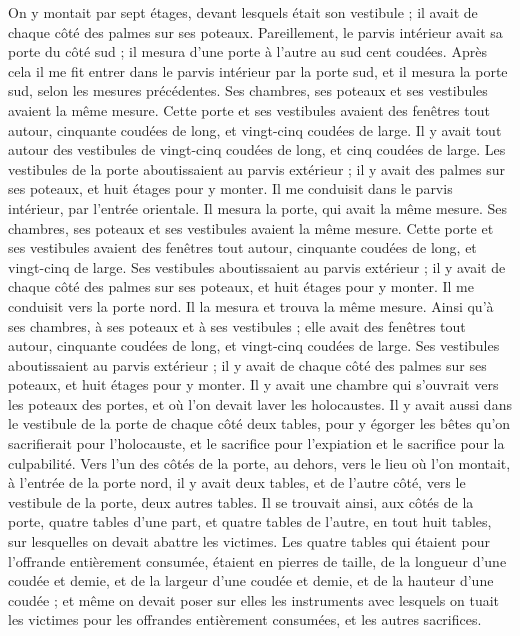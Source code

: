 \begin{multicols}{2}
On y montait par sept étages, devant lesquels était son vestibule ; il avait de chaque côté des palmes sur ses poteaux.
Pareillement, le parvis intérieur avait sa porte du côté sud ; il mesura d'une porte à l'autre au sud cent coudées.
Après cela il me fit entrer dans le parvis intérieur par la porte sud, et il mesura la porte sud, selon les mesures précédentes.
Ses chambres, ses poteaux et ses vestibules avaient la même mesure. Cette porte et ses vestibules avaient des fenêtres tout autour, cinquante coudées de long, et vingt-cinq coudées de large.
Il y avait tout autour des vestibules de vingt-cinq coudées de long, et cinq coudées de large.
Les vestibules de la porte aboutissaient au parvis extérieur ; il y avait des palmes sur ses poteaux, et huit étages pour y monter.
Il me conduisit dans le parvis intérieur, par l'entrée orientale. Il mesura la porte, qui avait la même mesure.
Ses chambres, ses poteaux et ses vestibules avaient la même mesure. Cette porte et ses vestibules avaient des fenêtres tout autour, cinquante coudées de long, et vingt-cinq de large.
Ses vestibules aboutissaient au parvis extérieur ; il y avait de chaque côté des palmes sur ses poteaux, et huit étages pour y monter.
Il me conduisit vers la porte nord. Il la mesura et trouva la même mesure.
Ainsi qu'à ses chambres, à ses poteaux et à ses vestibules ; elle avait des fenêtres tout autour, cinquante coudées de long, et vingt-cinq coudées de large.
Ses vestibules aboutissaient au parvis extérieur ; il y avait de chaque côté des palmes sur ses poteaux, et huit étages pour y monter.
Il y avait une chambre qui s'ouvrait vers les poteaux des portes, et où l'on devait laver les holocaustes.
Il y avait aussi dans le vestibule de la porte de chaque côté deux tables, pour y égorger les bêtes qu'on sacrifierait pour l'holocauste, et le sacrifice pour l'expiation et le sacrifice pour la culpabilité.
Vers l'un des côtés de la porte, au dehors, vers le lieu où l'on montait, à l'entrée de la porte nord, il y avait deux tables, et de l'autre côté, vers le vestibule de la porte, deux autres tables.
Il se trouvait ainsi, aux côtés de la porte, quatre tables d'une part, et quatre tables de l'autre, en tout huit tables, sur lesquelles on devait abattre les victimes.
Les quatre tables qui étaient pour l'offrande entièrement consumée, étaient en pierres de taille, de la longueur d'une coudée et demie, et de la largeur d'une coudée et demie, et de la hauteur d'une coudée ; et même on devait poser sur elles les instruments avec lesquels on tuait les victimes pour les offrandes entièrement consumées, et les autres sacrifices.

\end{multicols}

